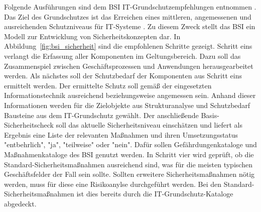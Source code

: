 \documentclass[11pt,a4paper]{report}
\begin{document}
Folgende Ausführungen sind dem BSI IT-Grundschutzempfehlungen entnommen \cite{bsi_standard1,bsi_standard2,bsi_standard3,bsi_standard4}.
Das Ziel des Grundschutzes ist das Erreichen eines mittleren, angemessenen und ausreichenden Schutzniveaus für IT-Systeme \cite{wiki_itgrundschutz}. Zu diesem Zweck stellt das BSI ein Modell zur Entwicklung von Sicherheitskonzepten dar. In Abbildung~\ref{fig:bsi_sicherheit} sind die empfohlenen Schritte gezeigt. Schritt eins verlangt die Erfassung aller Komponenten im Geltungsbereich. Dazu soll das Zusammenspiel zwischen Geschäftsprozessen und Anwendungen herausgearbeitet werden. Als nächstes soll der Schutzbedarf der Komponenten aus Schritt eins ermittelt werden. Der ermittelte Schutz soll gemäß der eingesetzten Informationstechnik ausreichend beziehungsweise angemessen sein. Anhand dieser Informationen werden für die Zielobjekte aus Strukturanalyse und Schutzbedarf Bausteine aus dem IT-Grundschutz gewählt. Der anschließende Basis-Sicherheitscheck soll das aktuelle Sicherheitsniveau einschätzen und liefert als Ergebnis eine Liste der relevanten Maßnahmen und ihren Umsetzungsstatus "entbehrlich", "ja", "teilweise" oder "nein". Dafür sollen Gefährdungenkataloge und Maßnahmenkataloge des BSI genutzt werden. In Schritt vier wird geprüft, ob die Standard-Sicherheitsmaßnahmen ausreichend sind, was für die meisten typischen Geschäftsfelder der Fall sein sollte. Sollten erweitere Sicherheitsmaßnahmen nötig werden, muss für diese eine Risikoanylse durchgeführt werden. Bei den Standard-Sicherheitsmaßnahmen ist dies bereits durch die IT-Grundschutz-Kataloge abgedeckt. 
\end{document}
